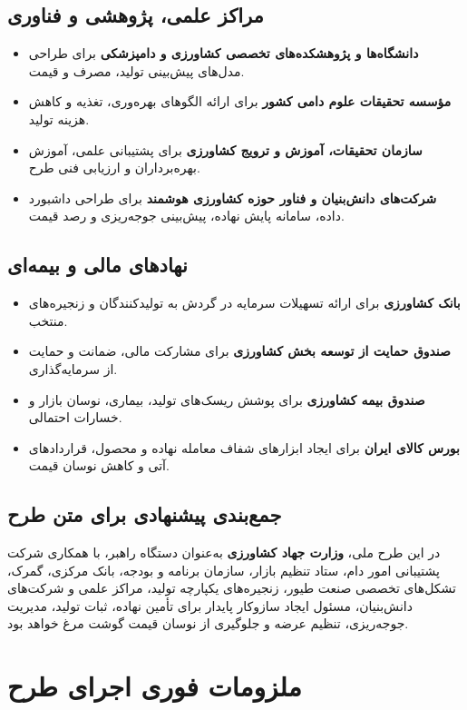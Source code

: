 \documentclass[12pt,a4paper]{report}
\begin{document}
\section{مراکز علمی، پژوهشی و فناوری}
\begin{itemize}
    \item \textbf{دانشگاه‌ها و پژوهشکده‌های تخصصی کشاورزی و دامپزشکی} برای طراحی مدل‌های پیش‌بینی تولید، مصرف و قیمت.
    \item \textbf{مؤسسه تحقیقات علوم دامی کشور} برای ارائه الگوهای بهره‌وری، تغذیه و کاهش هزینه تولید.
    \item \textbf{سازمان تحقیقات، آموزش و ترویج کشاورزی} برای پشتیبانی علمی، آموزش بهره‌برداران و ارزیابی فنی طرح.
    \item \textbf{شرکت‌های دانش‌بنیان و فناور حوزه کشاورزی هوشمند} برای طراحی داشبورد داده، سامانه پایش نهاده، پیش‌بینی جوجه‌ریزی و رصد قیمت.
\end{itemize}

\section{نهادهای مالی و بیمه‌ای}
\begin{itemize}
    \item \textbf{بانک کشاورزی} برای ارائه تسهیلات سرمایه در گردش به تولیدکنندگان و زنجیره‌های منتخب.
    \item \textbf{صندوق حمایت از توسعه بخش کشاورزی} برای مشارکت مالی، ضمانت و حمایت از سرمایه‌گذاری.
    \item \textbf{صندوق بیمه کشاورزی} برای پوشش ریسک‌های تولید، بیماری، نوسان بازار و خسارات احتمالی.
    \item \textbf{بورس کالای ایران} برای ایجاد ابزارهای شفاف معامله نهاده و محصول، قراردادهای آتی و کاهش نوسان قیمت.
\end{itemize}

\section*{جمع‌بندی پیشنهادی برای متن طرح}
در این طرح ملی، \textbf{وزارت جهاد کشاورزی} به‌عنوان دستگاه راهبر، با همکاری شرکت پشتیبانی امور دام، ستاد تنظیم بازار، سازمان برنامه و بودجه، بانک مرکزی، گمرک، تشکل‌های تخصصی صنعت طیور، زنجیره‌های یکپارچه تولید، مراکز علمی و شرکت‌های دانش‌بنیان، مسئول ایجاد سازوکار پایدار برای تأمین نهاده، ثبات تولید، مدیریت جوجه‌ریزی، تنظیم عرضه و جلوگیری از نوسان قیمت گوشت مرغ خواهد بود.

\chapter{ملزومات فوری اجرای طرح}
\end{document}

